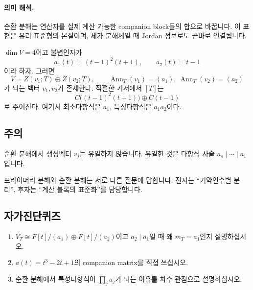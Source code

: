 \paragraph{의미 해석.}
순환 분해는 연산자를 실제 계산 가능한 companion block들의 합으로 바꿉니다. 이 표현은 유리 표준형의 본질이며, 체가 분해체일 때 Jordan 정보로도 곧바로 연결됩니다.

\begin{example}
$\dim V=4$이고 불변인자가
\[
a_1(t)=(t-1)^2(t+1),\qquad a_2(t)=t-1
\]
이라 하자. 그러면
\[
V=Z(v_1;T)\oplus Z(v_2;T),\qquad
\operatorname{Ann}_T(v_1)=(a_1),\ \operatorname{Ann}_T(v_2)=(a_2)
\]
가 되는 벡터 $v_1,v_2$가 존재한다. 적절한 기저에서 $[T]$는
\[
C\!\big((t-1)^2(t+1)\big)\oplus C(t-1)
\]
로 주어진다. 여기서 최소다항식은 $a_1$, 특성다항식은 $a_1a_2$이다.
\end{example}

\subsection*{주의}
\begin{warning}
순환 분해에서 생성벡터 $v_j$는 유일하지 않습니다. 유일한 것은 다항식 사슬 $a_s\mid\cdots\mid a_1$입니다.
\end{warning}
\begin{warning}
프라이머리 분해와 순환 분해는 서로 다른 질문에 답합니다. 전자는 ``기약인수별 분리'', 후자는 ``계산 블록의 표준화''를 담당합니다.
\end{warning}

\subsection*{자가진단퀴즈}
\begin{enumerate}[label=\arabic*.]
\item $V_T\cong F[t]/(a_1)\oplus F[t]/(a_2)$이고 $a_2\mid a_1$일 때 왜 $m_T=a_1$인지 설명하십시오.
\item $a(t)=t^3-2t+1$의 companion matrix를 직접 쓰십시오.
\item 순환 분해에서 특성다항식이 $\prod_j a_j$가 되는 이유를 차수 관점으로 설명하십시오.
\end{enumerate}


